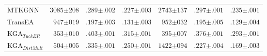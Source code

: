 \begin{table*}[]
\begin{center}
\begin{tabular}{l|rll|rll}
MTKGNN& $3085{\scriptstyle \pm 208}$ & $.289{\scriptstyle \pm .002}$ & $.227{\scriptstyle \pm .003}$ & $2743{\scriptstyle \pm 137}$ & $.297{\scriptstyle \pm .001}$ & $.235{\scriptstyle \pm .001}$  \\ 
TransEA& $947{\scriptstyle \pm 019}$ & $.197{\scriptstyle \pm .003}$ & $.131{\scriptstyle \pm .003}$ & $952{\scriptstyle \pm 032}$ & $.195{\scriptstyle \pm .005}$ & $.129{\scriptstyle \pm .004}$  \\ 
KGA$_{TuckER}$& $353{\scriptstyle \pm 010}$ & $.403{\scriptstyle \pm .001}$ & $.315{\scriptstyle \pm .001}$ & $395{\scriptstyle \pm 007}$ & $.376{\scriptstyle \pm .001}$ & $.293{\scriptstyle \pm .001}$  \\ 
KGA$_{DistMult}$& $504{\scriptstyle \pm 005}$ & $.335{\scriptstyle \pm .001}$ & $.250{\scriptstyle \pm .001}$ & $1422{\scriptstyle \pm 094}$ & $.227{\scriptstyle \pm .004}$ & $.169{\scriptstyle \pm .003}$  \\ 

\hline
\end{tabular}
\end{center}
\end{table*}

